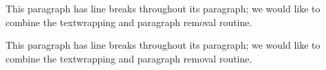 This paragraph
has line breaks throughout its paragraph;
we would like to combine
the textwrapping
and paragraph removal routine.
\begin{myenv}
This paragraph
has line breaks throughout its paragraph;
we would like to combine
the textwrapping
and paragraph removal routine.
\end{myenv}
